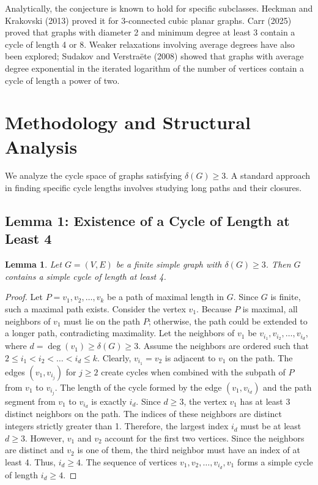 \documentclass[11pt, a4paper]{article}
\newtheorem{lemma}[theorem]{Lemma}
\begin{document}
Analytically, the conjecture is known to hold for specific subclasses. Heckman and Krakovski (2013) proved it for 3-connected cubic planar graphs. Carr (2025) proved that graphs with diameter 2 and minimum degree at least 3 contain a cycle of length 4 or 8. Weaker relaxations involving average degrees have also been explored; Sudakov and Verstra\"ete (2008) showed that graphs with average degree exponential in the iterated logarithm of the number of vertices contain a cycle of length a power of two.

\section{Methodology and Structural Analysis}

We analyze the cycle space of graphs satisfying $\delta(G) \ge 3$. A standard approach in finding specific cycle lengths involves studying long paths and their closures.

\subsection{Lemma 1: Existence of a Cycle of Length at Least 4}

\begin{lemma}
Let $G = (V, E)$ be a finite simple graph with $\delta(G) \ge 3$. Then $G$ contains a simple cycle of length at least 4.
\end{lemma}

\begin{proof}
Let $P = v_1, v_2, \dots, v_k$ be a path of maximal length in $G$. Since $G$ is finite, such a maximal path exists.
Consider the vertex $v_1$. Because $P$ is maximal, all neighbors of $v_1$ must lie on the path $P$; otherwise, the path could be extended to a longer path, contradicting maximality.
Let the neighbors of $v_1$ be $v_{i_1}, v_{i_2}, \dots, v_{i_d}$, where $d = \deg(v_1) \ge \delta(G) \ge 3$.
Assume the neighbors are ordered such that $2 \le i_1 < i_2 < \dots < i_d \le k$.
Clearly, $v_{i_1} = v_2$ is adjacent to $v_1$ on the path. The edges $(v_1, v_{i_j})$ for $j \ge 2$ create cycles when combined with the subpath of $P$ from $v_1$ to $v_{i_j}$.
The length of the cycle formed by the edge $(v_1, v_{i_d})$ and the path segment from $v_1$ to $v_{i_d}$ is exactly $i_d$.
Since $d \ge 3$, the vertex $v_1$ has at least 3 distinct neighbors on the path.
The indices of these neighbors are distinct integers strictly greater than 1.
Therefore, the largest index $i_d$ must be at least $d \ge 3$. However, $v_1$ and $v_2$ account for the first two vertices.
Since the neighbors are distinct and $v_2$ is one of them, the third neighbor must have an index of at least 4.
Thus, $i_d \ge 4$.
The sequence of vertices $v_1, v_2, \dots, v_{i_d}, v_1$ forms a simple cycle of length $i_d \ge 4$.
\end{proof}
\end{document}
